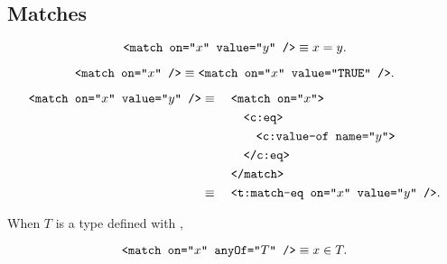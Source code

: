 \subsection{Matches}
\begin{definition}
  \begin{equation*}
    \texttt{<match on="$x$" value="$y$" />} \equiv x = y.
  \end{equation*}
\end{definition}

\begin{definition}
  \begin{equation*}
    \texttt{<match on="$x$" />}
      \equiv \texttt{<match on="$x$" value="TRUE" />}.
  \end{equation*}
\end{definition}

\begin{definition}
  \begin{alignat*}{2}
    \texttt{<match on="$x$" value="$y$" />}
      &\equiv {}&&\texttt{<match on="$x$">} \\
      &         &&\quad \texttt{<c:eq>} \\
      &         &&\quad\quad \texttt{<c:value-of name="$y$">} \\
      &         &&\quad \texttt{</c:eq>} \\
      &         &&\texttt{</match>} \\
      &\equiv {}&&\texttt{<t:match-eq on="$x$" value="$y$" />}.
  \end{alignat*}
\end{definition}

\begin{definition}
  When $T$ is a type defined with ,

  \begin{equation*}
    \texttt{<match on="$x$" anyOf="$T$" />} \equiv x \in T.
  \end{equation*}
\end{definition}
